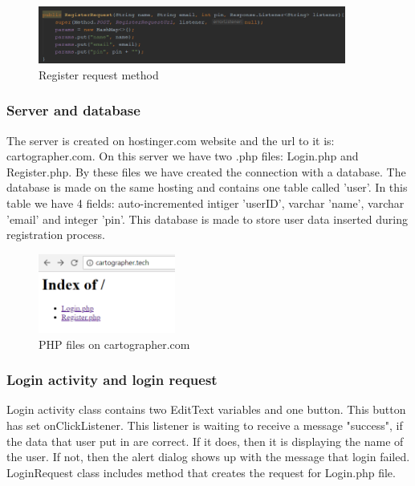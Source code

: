 \documentclass[12p]{article}
\begin{document}
    \begin{figure}[ht]
      \center
      \includegraphics[width=0.9\textwidth]{authentication/registerRequest.png}
      \caption{Register request method}
      \label{fig:register_request}
    \end{figure}
    
    \subsubsection{Server and database}
    
    The server is created on hostinger.com website and the url to it is: cartographer.com. On this server we have two .php files: Login.php and Register.php. By these files we have created the connection with a database. The database is made on the same hosting and contains one table called 'user'. In this table we have 4 fields: auto-incremented intiger 'userID', varchar 'name', varchar 'email' and integer 'pin'. This database is made to store user data inserted during registration process.
    
    
    \begin{figure}[ht]
      \center
      \includegraphics[width=0.4\textwidth]{authentication/server.png}
      \caption{PHP files on cartographer.com}
      \label{fig:register_request}
    \end{figure}

    \subsubsection{Login activity and login request}
    
    Login activity class contains two EditText variables and one button. This button has set onClickListener. This listener is waiting to receive a message "success", if the data that user put in are correct. If it does, then it is displaying the name of the user. If not, then the alert dialog shows up with the message that login failed. LoginRequest class includes method that creates the request for Login.php file.
    
\end{document}
